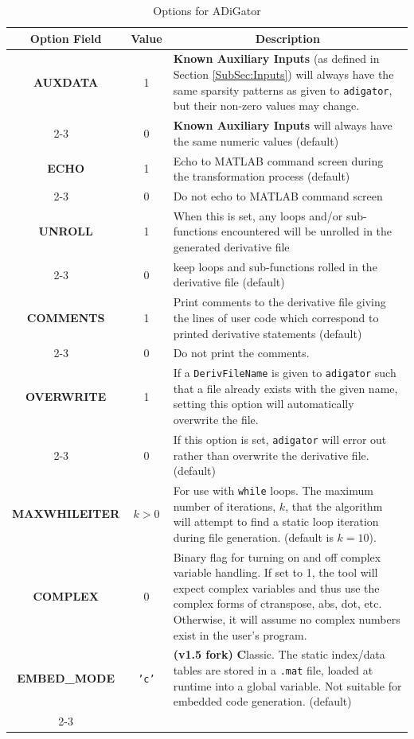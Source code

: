 \documentclass[10pt,pdftex]{article}
\begin{document}
\begin{table}[h]
\caption{Options for ADiGator \label{Tab:Options}}
\center
\begin{tabular}{|c|c|p{12cm}|}
\hline
\multicolumn{1}{|c|}{Option Field} & Value & \multicolumn{1}{c|}{Description}  \\ \hline
{\bf AUXDATA} & 1 & {\bf Known Auxiliary Inputs} (as defined in Section \ref{SubSec:Inputs})  will always have the same sparsity patterns as given to \texttt{adigator}, but their non-zero values may change. 
\\ \cline{2-3}
~ & 0 & {\bf Known Auxiliary Inputs} will always have the same numeric values (default) \\ \hline
{\bf ECHO} & 1 & Echo to MATLAB command screen during the transformation process (default) \\ \cline{2-3}
~ & 0 & Do not echo to MATLAB command screen \\ \hline
{\bf UNROLL} & 1 & When this is set, any loops and/or sub-functions encountered will be unrolled in the generated derivative file \\ \cline{2-3}
~ & 0 & keep loops and sub-functions rolled in the derivative file (default) \\ \hline
{\bf COMMENTS} & 1 & Print  comments to the derivative file giving the lines of user code which correspond to printed derivative statements (default) \\ \cline{2-3} 
~ & 0 & Do not print the comments. \\ \hline
{\bf OVERWRITE} & 1 & If a \texttt{DerivFileName} is given to \texttt{adigator} such that a file already exists with the given name, setting this option will automatically overwrite the file. \\ \cline{2-3} 
~ & 0 & If this option is set, \texttt{adigator} will error out rather than overwrite the derivative file. (default)\\ \hline
{\bf MAXWHILEITER} & $k > 0$ & For use with \texttt{while} loops. The maximum number of iterations, $k$, that the algorithm will attempt to find a static loop iteration during file generation. (default is $k = 10$).\\ \hline
{\bf COMPLEX} & 0 & Binary flag for turning on and off complex variable handling. If set to 1, the tool will expect complex variables and thus use the complex forms of ctranspose, abs, dot, etc. Otherwise, it will assume no complex numbers exist in the user's program.\\ \hline
{\bf EMBED\_MODE} & \texttt{'c'} & {\bf (v1.5 fork)} {\bf C}lassic. The static index/data tables are stored in a \texttt{.mat} file, loaded at runtime into a global variable. Not suitable for embedded code generation. (default) \\ \cline{2-3}

\end{tabular}
\end{table}
\end{document}
